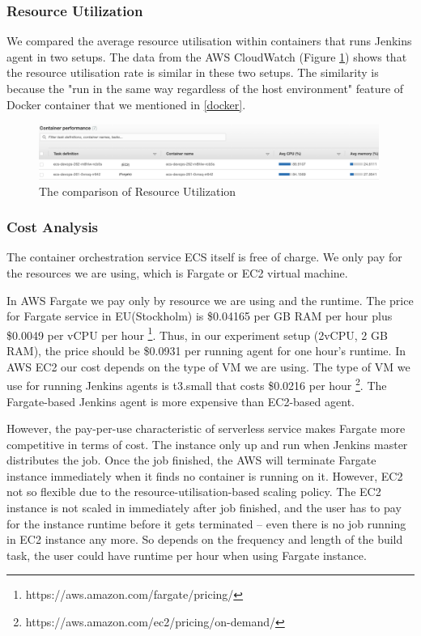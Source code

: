 \subsubsection{Resource Utilization}
We compared the average resource utilisation within containers that runs Jenkins agent in two setups. The data from the AWS CloudWatch (Figure \ref{fig:utilizationecs}) shows that the resource utilisation rate is similar in these two setups. The similarity is because the "run in the same way regardless of the host environment" \cite{WhatisaC60:online} feature of Docker container that we mentioned in \ref{docker}.
\begin{figure}[h]
\centering
\includegraphics[width=0.99\textwidth]{pics/utilizationecs.png}
\caption{The comparison of Resource Utilization}
\label{fig:utilizationecs}
\end{figure}
\subsubsection{Cost Analysis}
The container orchestration service ECS itself is free of charge. We only pay for the resources we are using, which is Fargate or EC2 virtual machine.
\par
In AWS Fargate we pay only by resource we are using and the runtime. The price for Fargate service in EU(Stockholm) is \$0.04165 per GB RAM per hour plus \$0.0049 per vCPU per hour \footnote{https://aws.amazon.com/fargate/pricing/}. Thus, in our experiment setup (2vCPU, 2 GB RAM), the price should be \$0.0931 per running agent for one hour's runtime.
In AWS EC2 our cost depends on the type of VM we are using. The type of VM we use for running Jenkins agents is t3.small that costs \$0.0216 per hour \footnote{https://aws.amazon.com/ec2/pricing/on-demand/}. The Fargate-based Jenkins agent is more expensive than EC2-based agent.
\par
However, the pay-per-use characteristic of serverless service makes Fargate more competitive in terms of cost. The instance only up and run when Jenkins master distributes the job. Once the job finished, the AWS will terminate Fargate instance immediately when it finds no container is running on it. However, EC2 not so flexible due to the resource-utilisation-based scaling policy. The EC2 instance is not scaled in immediately after job finished, and the user has to pay for the instance runtime before it gets terminated -- even there is no job running in EC2 instance any more. So depends on the frequency and length of the build task, the user could have runtime per hour when using Fargate instance.
